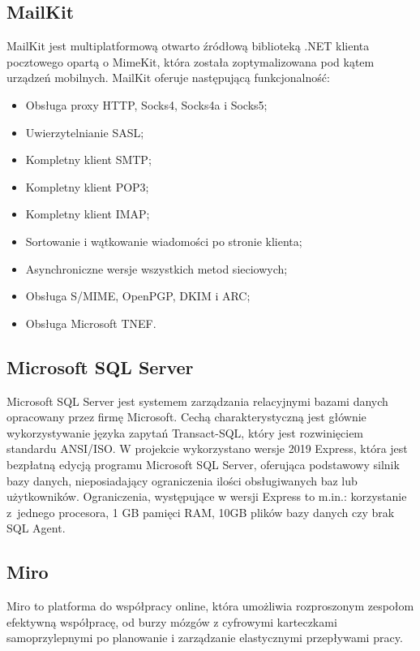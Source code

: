 \documentclass[12pt,a4paper]{article}
\begin{document}
		\subsection{MailKit}
			\indent MailKit jest multiplatformową otwarto źródłową biblioteką .NET klienta pocztowego opartą o MimeKit, która została zoptymalizowana pod kątem urządzeń mobilnych.
			MailKit oferuje następującą funkcjonalność:
			\begin{itemize}
				\item Obsługa proxy HTTP, Socks4, Socks4a i Socks5;
				\item Uwierzytelnianie SASL;
				\item Kompletny klient SMTP;
				\item Kompletny klient POP3;
				\item Kompletny klient IMAP;
				\item Sortowanie i wątkowanie wiadomości po stronie klienta;
				\item Asynchroniczne wersje wszystkich metod sieciowych;
				\item Obsługa S/MIME, OpenPGP, DKIM i ARC;
				\item Obsługa Microsoft TNEF.
			\end{itemize}

		\subsection{Microsoft SQL Server}		 
		 	\indent Microsoft SQL Server jest systemem zarządzania relacyjnymi bazami danych opracowany przez firmę Microsoft. Cechą charakterystyczną jest głównie wykorzystywanie języka
		 	zapytań	Transact-SQL, który jest rozwinięciem standardu ANSI/ISO. W projekcie wykorzystano wersje 2019 Express, która jest bezpłatną edycją programu Microsoft SQL Server, oferująca
		 	podstawowy silnik bazy danych, nieposiadający ograniczenia ilości obsługiwanych baz lub użytkowników. Ograniczenia, występujące w wersji Express to  m.in.:
		 	korzystanie z~jednego procesora, 1 GB pamięci RAM, 10GB plików bazy danych czy brak SQL Agent.
			
		\subsection{Miro}
			\indent Miro to platforma do współpracy online, która umożliwia rozproszonym zespołom efektywną współpracę, od burzy mózgów z cyfrowymi karteczkami samoprzylepnymi
					po planowanie i zarządzanie elastycznymi przepływami pracy.
		
\end{document}
